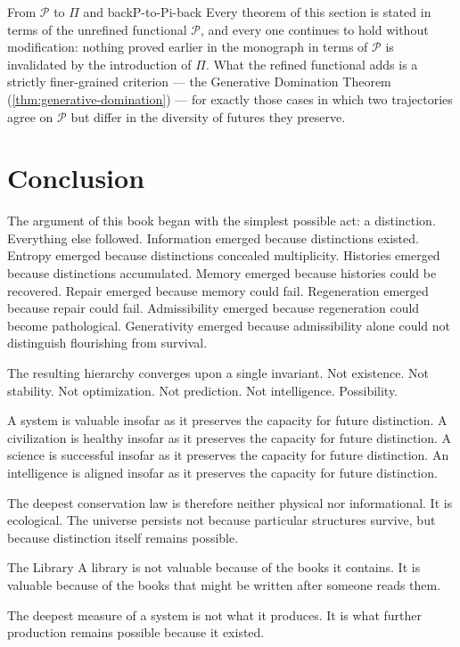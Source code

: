 \documentclass[12pt,twoside,openright]{book}
\begin{document}
\begin{remark}{From $\mathcal{P}$ to $\Pi$ and back}{P-to-Pi-back}
  Every theorem of this section is stated in terms of the
  unrefined functional $\mathcal{P}$, and every one continues
  to hold without modification: nothing proved earlier in
  the monograph in terms of $\mathcal{P}$ is invalidated by
  the introduction of $\Pi$. What the refined functional adds
  is a strictly finer-grained criterion --- the Generative
  Domination Theorem (\cref{thm:generative-domination}) ---
  for exactly those cases in which two trajectories agree on
  $\mathcal{P}$ but differ in the diversity of futures they
  preserve.
\end{remark}

\section{Conclusion}
\label{sec:ch31-conclusion}

The argument of this book began with the simplest possible
act: a distinction. Everything else followed. Information
emerged because distinctions existed. Entropy emerged
because distinctions concealed multiplicity. Histories
emerged because distinctions accumulated. Memory emerged
because histories could be recovered. Repair emerged because
memory could fail. Regeneration emerged because repair could
fail. Admissibility emerged because regeneration could
become pathological. Generativity emerged because
admissibility alone could not distinguish flourishing from
survival.

The resulting hierarchy converges upon a single invariant.
Not existence. Not stability. Not optimization. Not
prediction. Not intelligence. Possibility.

A system is valuable insofar as it preserves the capacity
for future distinction. A civilization is healthy insofar as
it preserves the capacity for future distinction. A science
is successful insofar as it preserves the capacity for
future distinction. An intelligence is aligned insofar as it
preserves the capacity for future distinction.

The deepest conservation law is therefore neither physical
nor informational. It is ecological. The universe persists
not because particular structures survive, but because
distinction itself remains possible.

\begin{distinctionaside}{The Library}
A library is not valuable because of the books it contains.
It is valuable because of the books that might be written
after someone reads them.

The deepest measure of a system is not what it produces. It
is what further production remains possible because it
existed.
\end{distinctionaside}
\end{document}
